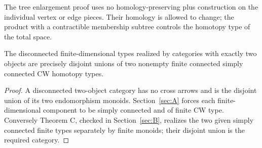 \begin{remark}\label{D:tree-repair-scope}
The tree enlargement proof uses no homology-preserving plus construction
on the individual vertex or edge pieces. Their homology is allowed to
change; the product with a contractible membership subtree controls the
homotopy type of the total space.
\end{remark}

\begin{corollary}\label{D:two-object-disconnected}
The disconnected finite-dimensional types realized by categories with
exactly two objects are precisely disjoint unions of two nonempty
finite connected simply connected CW homotopy types.
\end{corollary}
\begin{proof}
A disconnected two-object category has no cross arrows and is the
disjoint union of its two endomorphism monoids. Section~\ref{sec:A}
forces each finite-dimensional component to be simply connected and
of finite CW type. Conversely Theorem C, checked in Section~\ref{sec:B},
realizes the two given simply connected finite types separately by
finite monoids; their disjoint union is the required category.
\end{proof}
